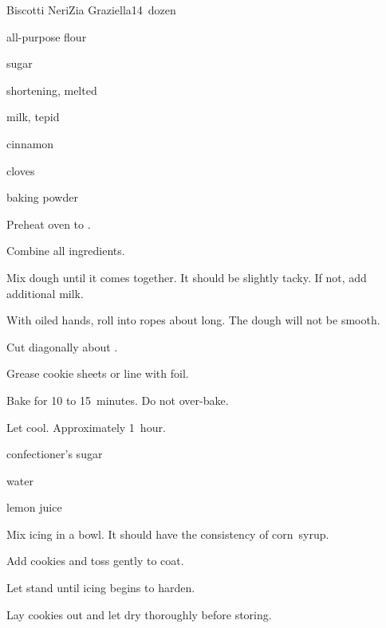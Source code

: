 \begin{recipe}{Biscotti Neri}{Zia Graziella}{14~dozen}

\begin{ingredients}
\item {} all-purpose flour
\item \C{\half} sugar
\item \lbs{\quarter} shortening, melted
\item {} milk, tepid
\item \Tp{1\half} 
\item {} cinnamon
\item \tp{\half} cloves
\item {} baking powder
\end{ingredients}

\begin{directions}
\item Preheat oven to .
\item Combine all ingredients.
\item Mix dough until it comes together. It should be slightly tacky. If not, add additional milk.
\item With oiled hands, roll into ropes about \inch{\quarter} long. The dough will not be smooth.
\item Cut diagonally about .
\item Grease cookie sheets or line with foil.
\item Bake for 10 to 15~minutes. Do not over-bake.
\item Let cool. Approximately 1~hour.
\end{directions}


\begin{ingredients}
\item confectioner's sugar
\item water
\item lemon juice
\end{ingredients}

\begin{directions}
\item Mix icing in a bowl. It should have the consistency of corn~syrup.
\item Add cookies and toss gently to coat.
\item Let stand until icing begins to harden.
\item Lay cookies out and let dry thoroughly before storing.
\end{directions}

\end{recipe}
